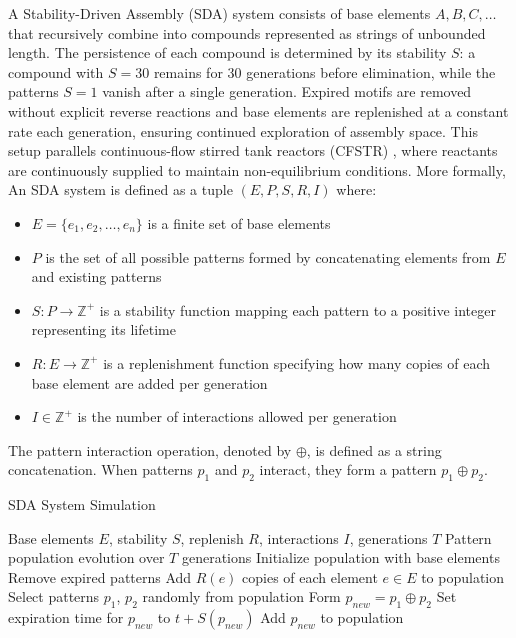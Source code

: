 \documentclass[life,article,submit,pdftex,moreauthors]{Definitions/mdpi}
\begin{document}
A Stability-Driven Assembly (SDA) \cite{adler_sda} system consists of base elements $A, B, C, \dots$ that recursively combine into compounds represented as
strings of unbounded length. The persistence of each compound is determined by its
stability $S$: a compound with $S=30$ remains for 30 generations before elimination, while the patterns $S=1$ vanish after a single generation. 
Expired motifs are removed without explicit reverse reactions and base
elements are replenished at a constant rate each generation, ensuring
continued exploration of assembly space. This setup parallels continuous-flow 
stirred tank reactors (CFSTR) \cite{fogler1999chemical}, where reactants are
continuously supplied to maintain non-equilibrium conditions. More formally, An SDA system is defined as a tuple $(E, P, S, R, I)$ where:
\begin{itemize}
   \item $E = \{e_1, e_2, \ldots, e_n\}$ is a finite set of base elements
   \item $P$ is the set of all possible patterns formed by concatenating elements from $E$ and existing patterns
   \item $S: P \rightarrow \mathbb{Z}^{+}$ is a stability function mapping each pattern to a positive integer representing its lifetime
   \item $R: E \rightarrow \mathbb{Z}^{+}$ is a replenishment function specifying how many copies of each base element are added per generation
   \item $I \in \mathbb{Z}^{+}$ is the number of interactions allowed per generation
\end{itemize}
The pattern interaction operation, denoted by $\oplus$, is defined as a string concatenation. When patterns $p_1$ and $p_2$ interact, they form a pattern $p_1 \oplus p_2$.

\begin{algorithm}[H]
\caption{SDA System Simulation}
\begin{algorithmic}[1]
\REQUIRE Base elements $E$, stability $S$, replenish $R$, interactions $I$, generations $T$
\ENSURE Pattern population evolution over $T$ generations
\STATE Initialize population with base elements
   \STATE Remove expired patterns
   \STATE Add $R(e)$ copies of each element $e \in E$ to population
       \STATE Select patterns $p_1$, $p_2$ randomly from population
       \STATE Form $p_{new} = p_1 \oplus p_2$
       \STATE Set expiration time for $p_{new}$ to $t + S(p_{new})$
       \STATE Add $p_{new}$ to population
   \ENDFOR
\ENDFOR
\end{algorithmic}
\end{algorithm}
\end{document}
